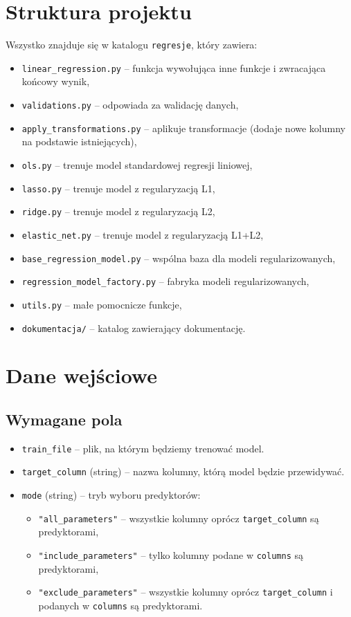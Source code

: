 \documentclass[12pt,a4paper]{article}
\begin{document}
\section{Struktura projektu}
Wszystko znajduje się w katalogu \texttt{regresje}, który zawiera:
\begin{itemize}
    \item \texttt{linear\_regression.py} – funkcja wywołująca inne funkcje i zwracająca końcowy wynik,
    \item \texttt{validations.py} – odpowiada za walidację danych,
    \item \texttt{apply\_transformations.py} – aplikuje transformacje (dodaje nowe kolumny na podstawie istniejących),
    \item \texttt{ols.py} – trenuje model standardowej regresji liniowej,
    \item \texttt{lasso.py} – trenuje model z regularyzacją L1,
    \item \texttt{ridge.py} – trenuje model z regularyzacją L2,
    \item \texttt{elastic\_net.py} – trenuje model z regularyzacją L1+L2,
    \item \texttt{base\_regression\_model.py} – wspólna baza dla modeli regularizowanych,
    \item \texttt{regression\_model\_factory.py} – fabryka modeli regularizowanych,
    \item \texttt{utils.py} – małe pomocnicze funkcje,
    \item \texttt{dokumentacja/} – katalog zawierający dokumentację.
\end{itemize}

\section{Dane wejściowe}
\subsection{Wymagane pola}
\begin{itemize}
    \item \texttt{train\_file} – plik, na którym będziemy trenować model.
    \item \texttt{target\_column} (string) – nazwa kolumny, którą model będzie przewidywać.
    \item \texttt{mode} (string) – tryb wyboru predyktorów:
        \begin{itemize}
            \item \texttt{"all\_parameters"} – wszystkie kolumny oprócz \texttt{target\_column} są predyktorami,
            \item \texttt{"include\_parameters"} – tylko kolumny podane w \texttt{columns} są predyktorami,
            \item \texttt{"exclude\_parameters"} – wszystkie kolumny oprócz \texttt{target\_column} i podanych w \texttt{columns} są predyktorami.
        \end{itemize}
\end{itemize}
\end{document}
